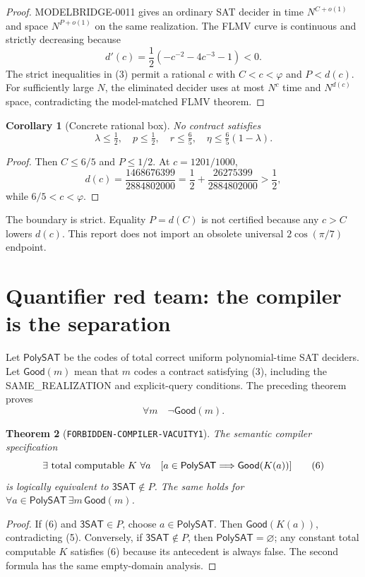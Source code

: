 \documentclass[11pt]{article}
\newtheorem{theorem}{Theorem}
\newtheorem{corollary}[theorem]{Corollary}
\newcommand{\SAT}{\mathsf{3SAT}}
\newcommand{\PolySAT}{\mathsf{PolySAT}}
\begin{document}
\begin{proof}
MODELBRIDGE-0011 gives an ordinary SAT decider in time $N^{C+o(1)}$ and
space $N^{P+o(1)}$ on the same realization.  The FLMV curve is continuous
and strictly decreasing because
\[
 d'(c)=\frac12(-c^{-2}-4c^{-3}-1)<0.
\]
The strict inequalities in (3) permit a rational $c$ with
$C<c<\varphi$ and $P<d(c)$.  For sufficiently large $N$, the eliminated
decider uses at most $N^c$ time and $N^{d(c)}$ space, contradicting the
model-matched FLMV theorem.
\end{proof}

\begin{corollary}[Concrete rational box]
No contract satisfies
\[
 \lambda\le\tfrac12,\quad p\le\tfrac12,\quad r\le\tfrac65,\quad
 \eta\le\tfrac65(1-\lambda).                             \tag{4}
\]
\end{corollary}
\begin{proof}
Then $C\le6/5$ and $P\le1/2$.  At $c=1201/1000$,
\[
 d(c)=\frac{1468676399}{2884802000}
 =\frac12+\frac{26275399}{2884802000}>\frac12,
\]
while $6/5<c<\varphi$.
\end{proof}

The boundary is strict.  Equality $P=d(C)$ is not certified because any
$c>C$ lowers $d(c)$.  This report does not import an obsolete universal
$2\cos(\pi/7)$ endpoint.

\section{Quantifier red team: the compiler is the separation}

Let $\PolySAT$ be the codes of total correct uniform polynomial-time SAT
deciders.  Let $\mathsf{Good}(m)$ mean that $m$ codes a contract satisfying
(3), including the SAME\_REALIZATION and explicit-query conditions.
The preceding theorem proves
\[
 \forall m\quad\neg\mathsf{Good}(m).                     \tag{5}
\]

\begin{theorem}[\texttt{FORBIDDEN-COMPILER-VACUITY1}]
The semantic compiler specification
\[
 \exists\hbox{ total computable }K\ \forall a\quad
 [a\in\PolySAT\Longrightarrow\mathsf{Good}(K(a))]        \tag{6}
\]
is logically equivalent to $\SAT\notin P$.  The same holds for
$\forall a\in\PolySAT\,\exists m\,\mathsf{Good}(m)$.
\end{theorem}
\begin{proof}
If (6) and $\SAT\in P$, choose $a\in\PolySAT$.  Then
$\mathsf{Good}(K(a))$, contradicting (5).  Conversely, if $\SAT\notin P$,
then $\PolySAT=\varnothing$; any constant total computable $K$ satisfies (6)
because its antecedent is always false.  The second formula has the same
empty-domain analysis.
\end{proof}
\end{document}
